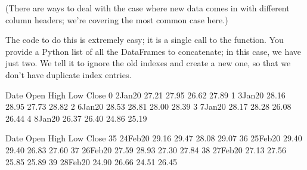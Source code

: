 \documentclass[letterpaper,10pt,english]{sphinxmanual}
\begin{document}
(There are ways to deal with the case where new data comes in with different column headers; we’re covering the most common case here.)

The code to do this is extremely easy; it is a single call to the  function.  You provide a Python list of all the DataFrames to concatenate; in this case, we have just two.  We tell it to ignore the old indexes and create a new one, so that we don’t have duplicate index entries.

\begin{sphinxVerbatim}[commandchars=\\\{\}]
   

    
    

   \PYG{p}{[}   \PYG{p}{]}  
\end{sphinxVerbatim}

\begin{sphinxVerbatim}[commandchars=\\\{\}]
       Date   Open   High    Low  Close
0  2\PYGZhy{}Jan\PYGZhy{}20  27.21  27.95  26.62  27.89
1  3\PYGZhy{}Jan\PYGZhy{}20  28.16  28.95  27.73  28.82
2  6\PYGZhy{}Jan\PYGZhy{}20  28.53  28.81  28.00  28.39
3  7\PYGZhy{}Jan\PYGZhy{}20  28.17  28.28  26.08  26.44
4  8\PYGZhy{}Jan\PYGZhy{}20  26.37  26.40  24.86  25.19
\end{sphinxVerbatim}

\begin{sphinxVerbatim}[commandchars=\\\{\}]
\end{sphinxVerbatim}

\begin{sphinxVerbatim}[commandchars=\\\{\}]
         Date   Open   High    Low  Close
35  24\PYGZhy{}Feb\PYGZhy{}20  29.16  29.47  28.08  29.07
36  25\PYGZhy{}Feb\PYGZhy{}20  29.40  29.40  26.83  27.60
37  26\PYGZhy{}Feb\PYGZhy{}20  27.59  28.93  27.30  27.84
38  27\PYGZhy{}Feb\PYGZhy{}20  27.13  27.56  25.85  25.89
39  28\PYGZhy{}Feb\PYGZhy{}20  24.90  26.66  24.51  26.45
\end{sphinxVerbatim}
\end{document}
